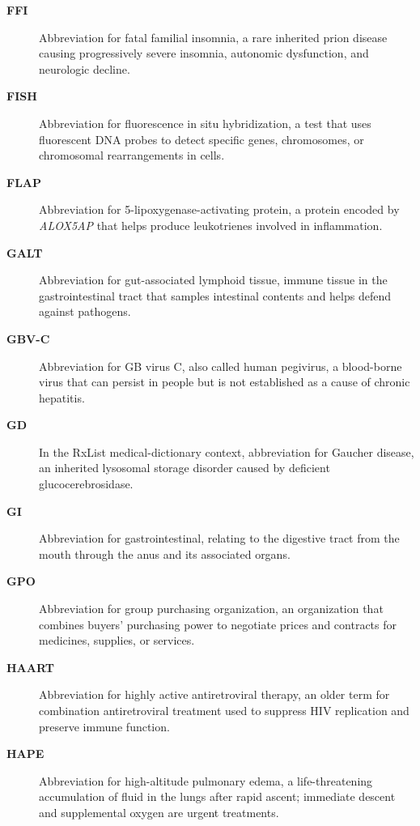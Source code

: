 \begin{description}
\item[\textbf{FFI}] Abbreviation for fatal familial insomnia, a rare inherited prion disease causing progressively severe insomnia, autonomic dysfunction, and neurologic decline.

\item[\textbf{FISH}] Abbreviation for fluorescence in situ hybridization, a test that uses fluorescent DNA probes to detect specific genes, chromosomes, or chromosomal rearrangements in cells.

\item[\textbf{FLAP}] Abbreviation for 5-lipoxygenase-activating protein, a protein encoded by \textit{ALOX5AP} that helps produce leukotrienes involved in inflammation.

\item[\textbf{GALT}] Abbreviation for gut-associated lymphoid tissue, immune tissue in the gastrointestinal tract that samples intestinal contents and helps defend against pathogens.

\item[\textbf{GBV-C}] Abbreviation for GB virus C, also called human pegivirus, a blood-borne virus that can persist in people but is not established as a cause of chronic hepatitis.

\item[\textbf{GD}] In the RxList medical-dictionary context, abbreviation for Gaucher disease, an inherited lysosomal storage disorder caused by deficient glucocerebrosidase.

\item[\textbf{GI}] Abbreviation for gastrointestinal, relating to the digestive tract from the mouth through the anus and its associated organs.

\item[\textbf{GPO}] Abbreviation for group purchasing organization, an organization that combines buyers' purchasing power to negotiate prices and contracts for medicines, supplies, or services.

\item[\textbf{HAART}] Abbreviation for highly active antiretroviral therapy, an older term for combination antiretroviral treatment used to suppress HIV replication and preserve immune function.

\item[\textbf{HAPE}] Abbreviation for high-altitude pulmonary edema, a life-threatening accumulation of fluid in the lungs after rapid ascent; immediate descent and supplemental oxygen are urgent treatments.


\end{description}
